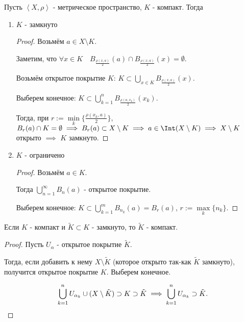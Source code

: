 \begin{theorem} \thmslashn

    Пусть $\left<X, \rho\right>$ - метрическое пространство, $K$ - компакт. Тогда

    \begin{enumerate}
        \item $K$ - замкнуто
            \begin{proof} \thmslashn
            
                Возьмём $a\in X \setminus K$.

                Заметим, что $\forall{x\in K}\quad B_{\frac{\rho(x, a)}{2}}(a) \cap  B_{\frac{\rho(x, a)}{2}}(x) = \emptyset$.

                Возьмём открытое покрытие $K$: $K \subset \bigcup\limits_{x\in K} B_{\frac{\rho(x, a)}{2}}(x)$.

                Выберем конечное: $K \subset \bigcup\limits_{k = 1}^{n} B_{\frac{\rho(a, x_{k})}{2}}(x_{k})$.

                Тогда, при $r := \min\limits_{k} \{\frac{\rho(x_{k}, a)}{2}\}$, $B_{r}(a)\cap K = \emptyset \implies B_{r}(a) \subset X \setminus K \implies a\in \Int (X \setminus K) \implies X \setminus K$ открыто $\implies$ $K$ замкнуто.
            \end{proof}
        \item $K$ - ограничено
            \begin{proof} \thmslashn
            
                Возьмём $a\in K$.

                Тогда $\bigcup_{n = 1}^{\infty} B_{n}(a)$ - открытое покрытие.

                Выберем конечное: $K \subset \bigcup_{k=1}^{m} B_{n_{k}}(a) = B_{r}(a) $, $r := \max\limits_{k} \{n_{k}\} $.
            \end{proof}
    \end{enumerate}
\end{theorem}
\begin{consequence} \thmslashn

    Если $K$ - компакт и $\tilde{K} \subset K$ - замкнуто, то $\tilde{K}$ - компакт.
    \begin{proof} \thmslashn
    
        Пусть $U_{\alpha}$ - открытое покрытие $\tilde{K}$.

        Тогда, если добавить к нему $X \setminus \tilde{K}$ (которое открыто так-как $\tilde{K}$ замкнуто), получится открытое покрытие $K$. Выберем конечное.

        \[ \bigcup_{k=1}^{n} U_{\alpha_{k}} \cup (X \setminus \tilde{K}) \supset K \supset \tilde{K} \implies \bigcup_{k=1}^{n} U_{\alpha_{k}} \supset \tilde{K} \qedhere .\] 
    \end{proof}
\end{consequence}
